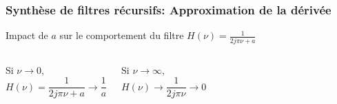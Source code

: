\documentclass{beamer}
\begin{document}
\begin{frame}
\frametitle{Synthèse de filtres récursifs: Approximation de la dérivée}
Impact de $a$ sur le comportement du filtre $H(\nu) = \frac{1}{2j\pi \nu + a}$\\
\vspace{0.2cm}
\begin{columns}[T]
\column{60mm}
Si $\nu \rightarrow 0$,\\
\vspace{0.2cm}
\[H(\nu) = \frac{1}{2j\pi \nu + a} \rightarrow \frac{1}{a} \]

\column{60mm}
Si $\nu \rightarrow \infty$,\\
\vspace{0.2cm}
\[H(\nu)  \rightarrow \frac{1}{2j\pi \nu} \rightarrow 0 \]\\
\vspace{1cm}
\end{columns} 



\end{frame}
\end{document}
